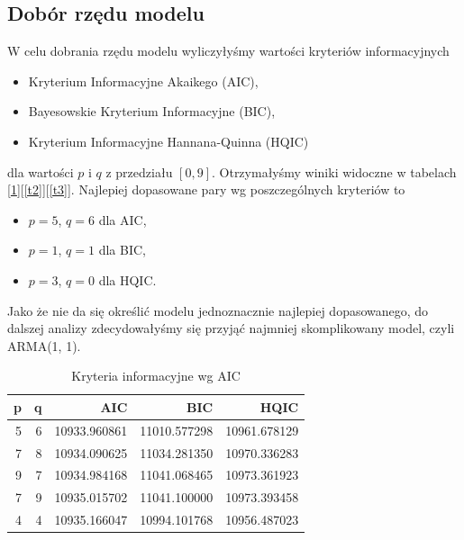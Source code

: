 \documentclass{article}
\theoremstyle{break}
\begin{document}
\subsection{Dobór rzędu modelu}
W celu dobrania rzędu modelu wyliczyłyśmy wartości kryteriów informacyjnych
\begin{itemize}
	\item Kryterium Informacyjne Akaikego (AIC),
	\item Bayesowskie Kryterium Informacyjne (BIC),
	\item Kryterium Informacyjne Hannana-Quinna (HQIC)
\end{itemize}

dla wartości $p$ i $q$ z przedziału $[0,9]$. Otrzymałyśmy winiki widoczne w tabelach [\ref{t1}][\ref{t2}][\ref{t3}]. Najlepiej dopasowane pary wg poszczególnych kryteriów to

\begin{itemize}
	\item $p=5$, $q=6$ dla AIC,
	\item $p=1$, $q=1$ dla BIC,
	\item $p=3$, $q=0$ dla HQIC.
\end{itemize}

Jako że nie da się określić modelu jednoznacznie najlepiej dopasowanego, do dalszej analizy zdecydowałyśmy się przyjąć najmniej skomplikowany model, czyli ARMA(1, 1).

\begin{table}[H]
	\centering
	\begin{tabular}{|r|r|r|r|r|}
		\hline
		\rowcolor[HTML]{C0C0C0} 
		{\color[HTML]{343434} \textbf{p}} & {\color[HTML]{343434} \textbf{q}} & {\color[HTML]{343434} \textbf{AIC}} & {\color[HTML]{343434} \textbf{BIC}} & {\color[HTML]{343434} \textbf{HQIC}} \\ \hline
		{\color[HTML]{343434} 5}          & {\color[HTML]{343434} 6}          & {\color[HTML]{343434} 10933.960861} & {\color[HTML]{343434} 11010.577298} & {\color[HTML]{343434} 10961.678129}  \\ \hline
		{\color[HTML]{343434} 7}          & {\color[HTML]{343434} 8}          & {\color[HTML]{343434} 10934.090625} & {\color[HTML]{343434} 11034.281350} & {\color[HTML]{343434} 10970.336283}  \\ \hline
		{\color[HTML]{343434} 9}          & {\color[HTML]{343434} 7}          & {\color[HTML]{343434} 10934.984168} & {\color[HTML]{343434} 11041.068465} & {\color[HTML]{343434} 10973.361923}  \\ \hline
		{\color[HTML]{343434} 7}          & {\color[HTML]{343434} 9}          & {\color[HTML]{343434} 10935.015702} & {\color[HTML]{343434} 11041.100000} & {\color[HTML]{343434} 10973.393458}  \\ \hline
		{\color[HTML]{343434} 4}          & {\color[HTML]{343434} 4}          & {\color[HTML]{343434} 10935.166047} & {\color[HTML]{343434} 10994.101768} & {\color[HTML]{343434} 10956.487023}  \\ \hline
	\end{tabular}
\caption{Kryteria informacyjne wg AIC}
\label{t1}
\end{table}
\end{document}
